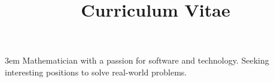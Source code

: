 \documentclass[a4paper,skipsamekey,11pt,english]{curve}
\title{Curriculum Vitae}
\begin{document}
\emergencystretch 3em
\makeheaders[c]
Mathematician with a passion for software and technology. Seeking interesting positions to solve real-world problems.

%


% 
\end{document}
